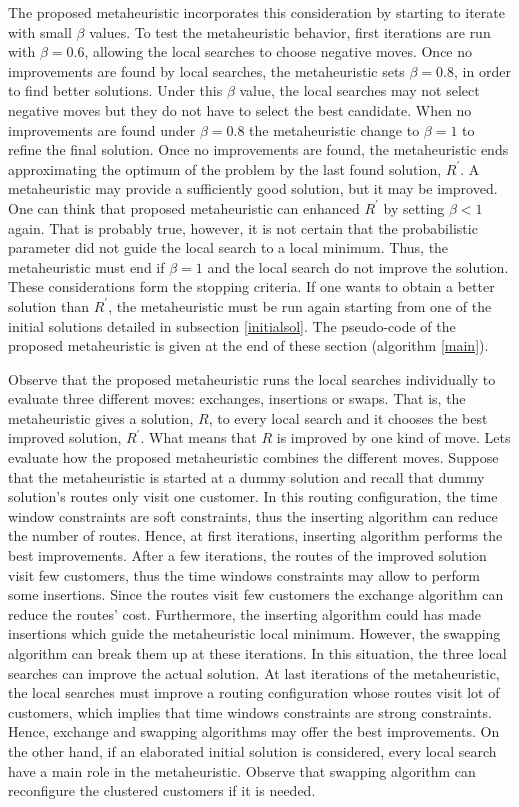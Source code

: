 The proposed metaheuristic incorporates this consideration by starting to iterate with small $\beta$ values. To test the metaheuristic behavior, first iterations are run with $\beta = 0.6$, allowing the local searches to choose negative moves. Once no improvements are found by local searches, the metaheuristic sets $\beta = 0.8$, in order to find better solutions. Under this $\beta$ value, the local searches may not select negative moves but they do not have to select the best candidate. When no improvements are found under $\beta = 0.8$ the metaheuristic change to $\beta=1$ to refine the final solution. Once no improvements are found, the metaheuristic ends approximating the optimum of the problem by the last found solution, $R^{'}$. A metaheuristic may provide a sufficiently good solution, but it may be improved. One can think that proposed metaheuristic can enhanced $R^{'}$ by setting $\beta<1$ again. That is probably true, however, it is not certain that the probabilistic parameter did not guide the local search to a local minimum. Thus, the metaheuristic must end if $\beta = 1$ and the local search do not improve the solution. These considerations form the stopping criteria. If one wants to obtain a better solution than $R^{'}$, the metaheuristic must be run again starting from one of the initial solutions detailed in subsection \ref{initialsol}. The pseudo-code of the proposed metaheuristic is given at the end of these section (algorithm \ref{main}).


Observe that the proposed metaheuristic runs the local searches individually to evaluate three different moves: exchanges, insertions or swaps. That is, the metaheuristic gives a solution, $R$, to every local search and it chooses the best improved solution, $R^{'}$. What means that $R$ is improved by one kind of move. Lets evaluate how the proposed metaheuristic combines the different moves. Suppose that the metaheuristic is started at a dummy solution and recall that dummy solution's routes only visit one customer. In this routing configuration, the time window constraints are soft constraints, thus the inserting algorithm can reduce the number of routes. Hence, at first iterations, inserting algorithm performs the best improvements. After a few iterations, the routes of the improved solution visit few customers, thus the time windows constraints may allow to perform some insertions. Since the routes visit few customers the exchange algorithm can reduce the routes' cost. Furthermore, the inserting algorithm could has made insertions which guide the metaheuristic local minimum. However, the swapping algorithm can break them up at these iterations. In this situation, the three local searches can improve the actual solution. At last iterations of the metaheuristic, the local searches must improve a routing configuration whose routes visit lot of customers, which implies that time windows constraints are strong constraints. Hence, exchange and swapping algorithms may offer the best improvements. On the other hand, if an elaborated initial solution is considered, every local search have a main role in the metaheuristic. Observe that swapping algorithm can reconfigure the clustered customers if it is needed.

